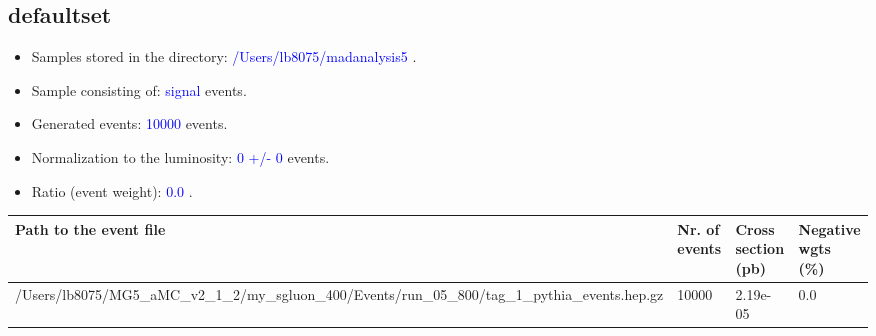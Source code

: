 \documentclass[a4paper, 11pt]{article}
\begin{document}
\subsection{ defaultset}

\begin{itemize}
  \item Samples stored in the directory: \textcolor{blue}{/\-Users/\-lb8075/\-madanalysis5} .
   \item Sample consisting of: \textcolor{blue}{signal}  events.
   \item Generated events: \textcolor{blue}{10000 }  events.
   \item Normalization to the luminosity: \textcolor{blue}{0}\textcolor{blue}{ +/\-- }\textcolor{blue}{0 }  events.
   \item Ratio (event weight): \textcolor{blue}{0.0 } .  
 
\end{itemize}
\begin{table}[!h]
  \begin{center}
    \begin{tabular}{|m{51.0mm}|m{24.0mm}|m{28.0mm}|m{28.0mm}|}
      \hline
      \cellcolor{yellow}         Path to the event file& \cellcolor{yellow}         Nr. of events& \cellcolor{yellow}         Cross section (pb)& \cellcolor{yellow}         Negative wgts (\%)\\
      \hline
      \cellcolor{white}          /\-Users/\-lb8075/\-MG5\_aMC\_v2\_1\_2/\-my\_sgluon\_400/\-Events/\-run\_05\_800/\-tag\_1\_pythia\_events.hep.gz& \cellcolor{white}          10000& \cellcolor{white}          2.19e-05& \cellcolor{white}          0.0\\
\hline
    \end{tabular}
  \end{center}
\end{table}
\end{document}
